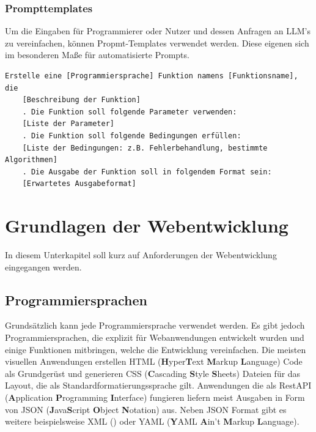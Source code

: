 

\subsubsection{Prompttemplates}
Um die Eingaben für Programmierer oder Nutzer und dessen Anfragen an LLM's zu vereinfachen, können Propmt-Templates verwendet werden. Diese eigenen sich im besonderen Maße für automatisierte Prompts.

\begin{lstlisting}[language=text]
	Erstelle eine [Programmiersprache] Funktion namens [Funktionsname], die 
	[Beschreibung der Funktion]
	. Die Funktion soll folgende Parameter verwenden:
	[Liste der Parameter]
	. Die Funktion soll folgende Bedingungen erfüllen:
	[Liste der Bedingungen: z.B. Fehlerbehandlung, bestimmte Algorithmen]
	. Die Ausgabe der Funktion soll in folgendem Format sein:
	[Erwartetes Ausgabeformat]
\end{lstlisting}




\section{Grundlagen der Webentwicklung}
In diesem Unterkapitel soll kurz auf Anforderungen der Webentwicklung eingegangen werden.


\subsection{Programmiersprachen}
Grundsätzlich kann jede Programmiersprache verwendet werden. Es gibt jedoch Programmiersprachen, die explizit für Webanwendungen entwickelt wurden und einige Funktionen mitbringen, welche die Entwicklung vereinfachen. Die meisten visuellen Anwendungen erstellen HTML (\textbf{H}yper\textbf{T}ext \textbf{M}arkup \textbf{L}anguage) Code als Grundgerüst und generieren CSS (\textbf{C}ascading \textbf{S}tyle \textbf{S}heets) Dateien für das Layout, die als Standardformatierungssprache gilt. Anwendungen die als RestAPI (\textbf{A}pplication \textbf{P}rogramming \textbf{I}nterface) fungieren liefern meist Ausgaben in Form von JSON (\textbf{J}ava\textbf{S}cript \textbf{O}bject \textbf{N}otation) aus. Neben JSON Format gibt es weitere beispielsweise XML () oder YAML (\textbf{Y}AML \textbf{A}in’t \textbf{M}arkup \textbf{L}anguage).\vspace{0.2cm}


